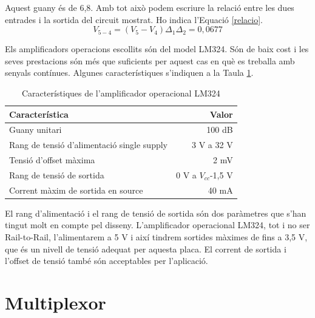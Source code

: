 \noindent Aquest guany és de 6,8. Amb tot això podem escriure la relació entre les dues entrades i la sortida del circuit mostrat. Ho indica l'Equació \ref{relacio}.
\begin{equation} \label{relacio}
V_{5-4} =  \left (V_5 - V_4  \right ) \Delta_{1} \Delta_{2} = 0,0677
\end{equation}


%
%
%
\noindent Els amplificadors operacions escollits són del model LM324. Són de baix cost i les seves prestacions són més que suficients per aquest cas en què es treballa amb senyals contínues. Algunes característiques s'indiquen a la Taula \ref{tab:lm324}.
\begin{table}[H]
\small
\begin{center}
 \begin{tabular} {|l|r|}%
 \hline
 Característica & Valor \\
 \hline \hline 
Guany unitari & 100 dB \\ \hline
Rang de tensió d'alimentació single supply & 3 V a 32 V \\ \hline
Tensió d'offset màxima & 2 mV \\ \hline
Rang de tensió de sortida & 0 V a $V_{cc}$-1,5 V \\ \hline
Corrent màxim de sortida en source & 40 mA \\ \hline

 \end{tabular}
 \caption{Característiques de l'amplificador operacional LM324}
 \label{tab:lm324}
\end{center}
\end{table}
%
\noindent El rang d'alimentació i el rang de tensió de sortida són dos paràmetres que s'han tingut molt en compte pel disseny. L'amplificador operacional LM324, tot i no ser Rail-to-Rail, l'alimentarem a 5 V i així tindrem sortides màximes de fins a 3,5 V, que és un nivell de tensió adequat per aquesta placa. El corrent de sortida i l'offset de tensió també són acceptables per l'aplicació.

\section{Multiplexor}

